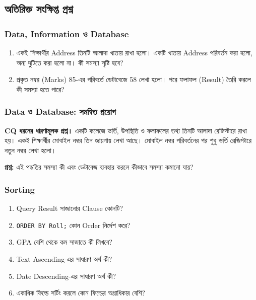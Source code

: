 \subsection{অতিরিক্ত সংক্ষিপ্ত প্রশ্ন}
\subsubsection{Data, Information ও Database}
\begin{enumerate}
\item একই শিক্ষার্থীর Address তিনটি আলাদা খাতায় রাখা হলো।
    একটি খাতায় Address পরিবর্তন করা হলো, অন্য দুটিতে করা হলো না।
    কী সমস্যা সৃষ্টি হবে?

    \item প্রকৃত নম্বর (Marks) 85-এর পরিবর্তে ডেটাবেজে 58 লেখা হলো।
    পরে ফলাফল (Result) তৈরি করলে কী সমস্যা হতে পারে?

    \end{enumerate}

\subsubsection{Data ও Database: সমন্বিত প্রয়োগ}
\noindent\textbf{CQ ধরনের ধারণামূলক প্রশ্ন।} একটি কলেজে ভর্তি, উপস্থিতি ও ফলাফলের তথ্য তিনটি আলাদা রেজিস্টারে
রাখা হয়। একই শিক্ষার্থীর মোবাইল নম্বর তিন জায়গায় লেখা আছে।
মোবাইল নম্বর পরিবর্তনের পর শুধু ভর্তি রেজিস্টারে নতুন নম্বর লেখা হলো।

\textbf{প্রশ্ন:} এই পদ্ধতির সমস্যা কী এবং ডেটাবেজ ব্যবহার করলে
কীভাবে সমস্যা কমানো যায়?





\subsubsection{Sorting}
\begin{enumerate}
\item Query Result সাজানোর Clause কোনটি?

    \item \texttt{ORDER BY Roll;} কোন Order নির্দেশ করে?

    \item GPA বেশি থেকে কম সাজাতে কী লিখবে?

    \item Text Ascending-এর সাধারণ অর্থ কী?

    \item Date Descending-এর সাধারণ অর্থ কী?

    \item একাধিক ফিল্ডে সর্টিং করলে কোন ফিল্ডের অগ্রাধিকার বেশি?

    \end{enumerate}
